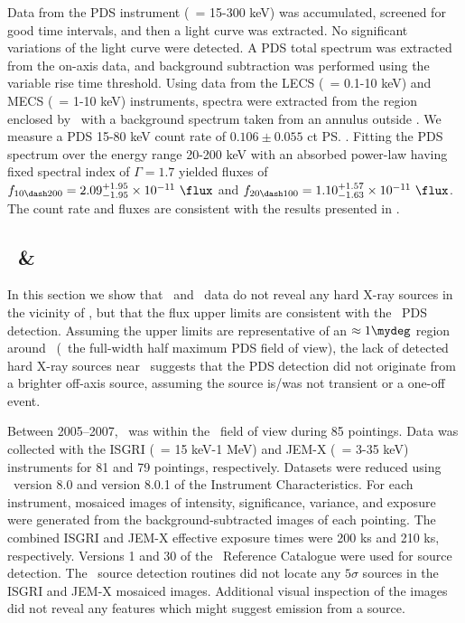 \documentclass[useAMS,usenatbib]{mn2e}
\begin{document}
Data from the PDS instrument (\esens\ = 15-300 keV) was accumulated,
screened for good time intervals, and then a light curve was
extracted. No significant variations of the light curve were
detected. A PDS total spectrum was extracted from the on-axis data,
and background subtraction was performed using the variable rise time
threshold. Using data from the LECS (\esens\ = 0.1-10 keV) and MECS
(\esens\ = 1-10 keV) instruments, spectra were extracted from the
region enclosed by \rf\ with a background spectrum taken from an
annulus outside \rf. We measure a PDS 15-80 keV count rate of $0.106
\pm 0.055$ ct \ps. Fitting the PDS spectrum over the energy range
20-200 keV with an absorbed power-law having fixed spectral index of
$\Gamma = 1.7$ yielded fluxes of $f_{10 \dash 200} =
2.09^{+1.95}_{-1.95} \times 10^{-11} ~\flux$ and $f_{20 \dash 100} =
1.10^{+1.57}_{-1.63} \times 10^{-11} ~\flux$. The count rate and
fluxes are consistent with the results presented in
\citet{2000A&A...353..910F}.

\subsection{\integral\ \& \swift}
\label{sec:integral}

In this section we show that \integral\ and \swift\ data do not reveal
any hard X-ray sources in the vicinity of \irs, but that the flux
upper limits are consistent with the \bepposax\ PDS
detection. Assuming the upper limits are representative of an $\approx
1\mydeg$ region around \irs\ (\ie\ the full-width half maximum PDS
field of view), the lack of detected hard X-ray sources near
\irs\ suggests that the PDS detection did not originate from a
brighter off-axis source, assuming the source is/was not transient or
a one-off event.

Between 2005--2007, \irs\ was within the \integral\ field of view
during 85 pointings. Data was collected with the ISGRI (\esens\ = 15
keV-1 MeV) and JEM-X (\esens\ = 3-35 keV) instruments for 81 and 79
pointings, respectively. Datasets were reduced using \osa\ version 8.0
and version 8.0.1 of the Instrument Characteristics. For each
instrument, mosaiced images of intensity, significance, variance, and
exposure were generated from the background-subtracted images of each
pointing. The combined ISGRI and JEM-X effective exposure times were
200 ks and 210 ks, respectively. Versions 1 and 30 of the
\integral\ Reference Catalogue were used for source detection. The
\osa\ source detection routines did not locate any $5\sigma$ sources
in the ISGRI and JEM-X mosaiced images. Additional visual inspection
of the images did not reveal any features which might suggest emission
from a source.
\end{document}
